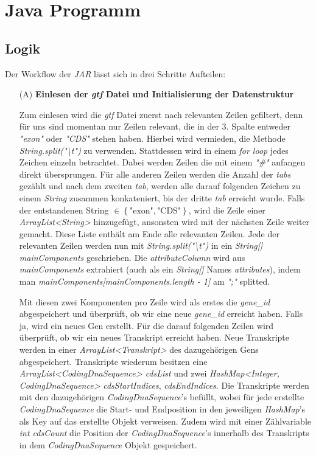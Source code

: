 \documentclass[12pt]{article}
\begin{document}
\section{Java Programm}
\subsection{Logik}\label{sec:logik}
Der Workflow der \textit{JAR} lässt sich in drei Schritte Aufteilen:
\begin{enumerate}
    \item[(A)] \textbf{Einlesen der \textit{gtf} Datei und Initialisierung der Datenstruktur}

        Zum einlesen wird die \textit{gtf} Datei zuerst nach relevanten Zeilen gefiltert, denn
        für uns sind momentan nur Zeilen relevant, die in der 3. Spalte entweder
        \textit{"exon"} oder \textit{"CDS"} stehen haben. Hierbei wird vermieden,
        die Methode \textit{String.split("\textbackslash t")} zu verwenden.
        Stattdessen wird in einem \textit{for loop} jedes Zeichen einzeln betrachtet.
        Dabei werden Zeilen die mit einem \textit{"\#"} anfangen direkt übersprungen.
        Für alle anderen Zeilen werden die Anzahl der \textit{tabs} gezählt und nach 
        dem zweiten \textit{tab}, werden alle darauf folgenden Zeichen zu einem 
        \textit{String} zusammen konkateniert, bis der dritte \textit{tab} 
        erreicht wurde. Falls der entstandenen String $\in \left\{\text{"exon"}, \text{"CDS"} \right\}$, wird die 
        Zeile einer \textit{ArrayList<String>} hinzugefügt, ansonsten wird mit der nächsten Zeile weiter gemacht. 
        Diese Liste enthält am Ende alle relevanten Zeilen. 
        Jede der relevanten Zeilen werden nun mit \textit{String.split("\textbackslash t")} in
        ein \textit{String[] mainComponents} geschrieben. Die \textit{attributeColumn} wird aus
        \textit{mainComponents} extrahiert (auch als ein \textit{String[]} Names \textit{attributes}),
        indem man \textit{mainComponents[mainComponents.length - 1]} am \textit{";"} splitted.

        Mit diesen zwei Komponenten pro Zeile wird als erstes die \textit{gene\_id} abgespeichert
        und überprüft, ob wir eine neue \textit{gene\_id} erreicht haben. 
        Falls ja, wird ein neues Gen erstellt. Für die darauf folgenden Zeilen wird überprüft,
        ob wir ein neues Transkript erreicht haben. Neue Transkripte werden in einer
        \textit{ArrayList<Transkript>} des dazugehörigen Gens abgespeichert. 
        Transkripte wiederum besitzen eine \textit{ArrayList<CodingDnaSequence> cdsList} und zwei
        \textit{HashMap<Integer, CodingDnaSequence>} \textit{cdsStartIndices}, \textit{cdsEndIndices}. Die Transkripte werden mit den dazugehörigen
        \textit{CodingDnaSequence}'s befüllt, wobei für jede erstellte \textit{CodingDnaSequence} die Start- und 
        Endposition in den jeweiligen \textit{HashMap}'s als Key auf das erstellte Objekt verweisen.
        Zudem wird mit einer Zählvariable \textit{int cdsCount} die Position der \textit{CodingDnaSequence}'s
        innerhalb des Transkripts in dem \textit{CodingDnaSequence} Objekt gespeichert.


\end{enumerate}
\end{document}
